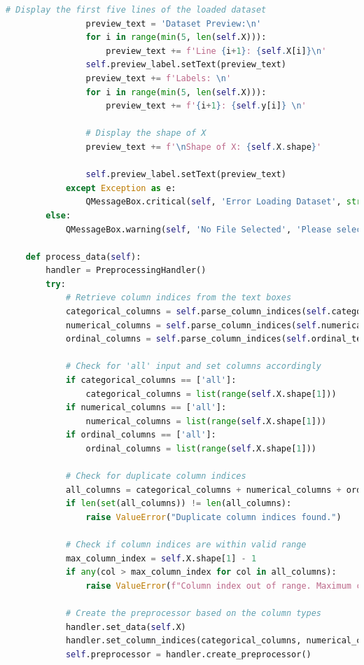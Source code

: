 \documentclass[letterpaper,10pt]{article}
\begin{document}
\begin{lstlisting}[language=Python, caption=ui.py - Final structure after refactoring. ]
                # Display the first five lines of the loaded dataset
                preview_text = 'Dataset Preview:\n'
                for i in range(min(5, len(self.X))):
                    preview_text += f'Line {i+1}: {self.X[i]}\n'
                self.preview_label.setText(preview_text)
                preview_text += f'Labels: \n'
                for i in range(min(5, len(self.X))):
                    preview_text += f'{i+1}: {self.y[i]} \n'
                
                # Display the shape of X
                preview_text += f'\nShape of X: {self.X.shape}'

                self.preview_label.setText(preview_text)
            except Exception as e:
                QMessageBox.critical(self, 'Error Loading Dataset', str(e))
        else:
            QMessageBox.warning(self, 'No File Selected', 'Please select a dataset file.')
    
    def process_data(self):
        handler = PreprocessingHandler()
        try:
            # Retrieve column indices from the text boxes
            categorical_columns = self.parse_column_indices(self.categorical_text.text())
            numerical_columns = self.parse_column_indices(self.numerical_text.text())
            ordinal_columns = self.parse_column_indices(self.ordinal_text.text())

            # Check for 'all' input and set columns accordingly
            if categorical_columns == ['all']:
                categorical_columns = list(range(self.X.shape[1]))
            if numerical_columns == ['all']:
                numerical_columns = list(range(self.X.shape[1]))
            if ordinal_columns == ['all']:
                ordinal_columns = list(range(self.X.shape[1]))

            # Check for duplicate column indices
            all_columns = categorical_columns + numerical_columns + ordinal_columns
            if len(set(all_columns)) != len(all_columns):
                raise ValueError("Duplicate column indices found.")

            # Check if column indices are within valid range
            max_column_index = self.X.shape[1] - 1
            if any(col > max_column_index for col in all_columns):
                raise ValueError(f"Column index out of range. Maximum column index is {max_column_index}.")

            # Create the preprocessor based on the column types
            handler.set_data(self.X)
            handler.set_column_indices(categorical_columns, numerical_columns, ordinal_columns)
            self.preprocessor = handler.create_preprocessor()


\end{lstlisting}
\end{document}
